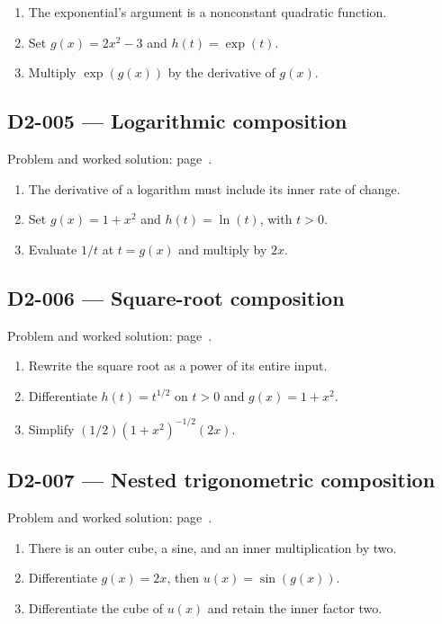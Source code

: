 \documentclass[11pt,oneside,openany]{book}
\begin{document}
\begin{enumerate}
\item The exponential's argument is a nonconstant quadratic function.
\item Set \(g(x)=2x^2-3\) and \(h(t)=\exp(t)\).
\item Multiply \(\exp(g(x))\) by the derivative of \(g(x)\).
\end{enumerate}
\subsection*{D2-005 --- Logarithmic composition}
\label{hints:D2-005}
Problem and worked solution: page~\pageref{problem:D2-005}.

\begin{enumerate}
\item The derivative of a logarithm must include its inner rate of change.
\item Set \(g(x)=1+x^2\) and \(h(t)=\ln(t)\), with \(t>0\).
\item Evaluate \(1/t\) at \(t=g(x)\) and multiply by \(2x\).
\end{enumerate}
\subsection*{D2-006 --- Square-root composition}
\label{hints:D2-006}
Problem and worked solution: page~\pageref{problem:D2-006}.

\begin{enumerate}
\item Rewrite the square root as a power of its entire input.
\item Differentiate \(h(t)=t^{1/2}\) on \(t>0\) and \(g(x)=1+x^2\).
\item Simplify \((1/2)(1+x^2)^{-1/2}(2x)\).
\end{enumerate}
\subsection*{D2-007 --- Nested trigonometric composition}
\label{hints:D2-007}
Problem and worked solution: page~\pageref{problem:D2-007}.

\begin{enumerate}
\item There is an outer cube, a sine, and an inner multiplication by two.
\item Differentiate \(g(x)=2x\), then \(u(x)=\sin(g(x))\).
\item Differentiate the cube of \(u(x)\) and retain the inner factor two.
\end{enumerate}
\end{document}
